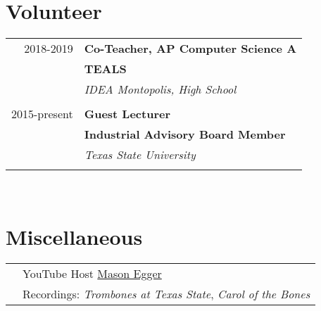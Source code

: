 \documentclass[10pt]{article} %
\begin{document}
\begin{minipage}[t]{0.44\textwidth}
\begin{tabular}{rl}
\end{tabular}\\[10pt]





\section{Volunteer} 

\begin{tabular}{rl}
2018-2019     & \textbf{Co-Teacher, AP Computer Science A}\\
& \textbf{TEALS}\\
& \textit{IDEA Montopolis, High School}\\ \\

2015-present & \textbf{Guest Lecturer}\\
& \textbf{Industrial Advisory Board Member}\\
& \textit{Texas State University}\\\\

\end{tabular}\\


\section{Miscellaneous} 

\begin{tabular}{rl}
& YouTube Host \href{https://www.youtube.com/masonegger}{Mason Egger}\\
& Recordings: \textit{Trombones at Texas State}, \textit{Carol of the Bones} \\
\end{tabular}\\[10pt]

	
\end{minipage} %
\end{document}
